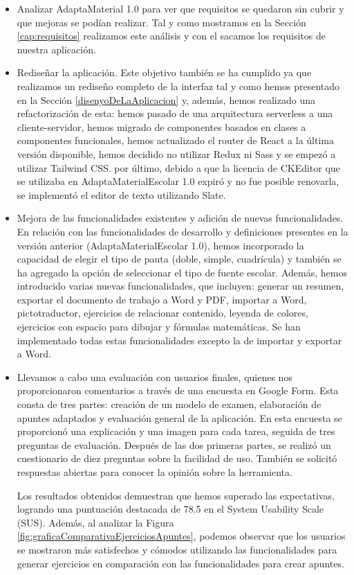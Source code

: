 \begin{itemize}
    \item Analizar AdaptaMaterial 1.0 para ver que requisitos se quedaron sin cubrir y que mejoras se podían realizar. Tal y como mostramos en la Sección \ref{cap:requisitos} realizamos este análisis y con el sacamos los requisitos de nuestra aplicación.
    \item Rediseñar la aplicación. Este objetivo también se ha cumplido ya que realizamos un rediseño completo de la interfaz tal y como hemos presentado en la Sección \ref{disenyoDeLaAplicacion} y, además, hemos realizado una refactorización de esta: hemos pasado de una arquitectura serverless a una cliente-servidor, hemos migrado de componentes basados en clases a componentes funcionales, hemos actualizado el router de React a la última versión disponible, hemos decidido no utilizar Redux ni Sass y se empezó a utilizar Tailwind CSS. por último, debido a que la licencia de CKEditor que se utilizaba en AdaptaMaterialEscolar 1.0 expiró y no fue posible renovarla, se implementó el editor de texto utilizando Slate.
    \item Mejora de las funcionalidades existentes y adición de nuevas funcionalidades. En relación con las funcionalidades de desarrollo y definiciones presentes en la versión anterior (AdaptaMaterialEscolar 1.0), hemos incorporado la capacidad de elegir el tipo de pauta (doble, simple, cuadrícula) y también se ha agregado la opción de seleccionar el tipo de fuente escolar. Además, hemos introducido varias nuevas funcionalidades, que incluyen: generar un resumen, exportar el documento de trabajo a Word y PDF, importar a Word, pictotraductor, ejercicios de relacionar contenido, leyenda de colores, ejercicios con espacio para dibujar y fórmulas matemáticas. Se han implementado todas estas funcionalidades excepto la de importar y exportar a Word.
    \item Llevamos a cabo una evaluación con usuarios finales, quienes nos proporcionaron comentarios a través de una encuesta en Google Form. Esta consta de tres partes: creación de un modelo de examen, elaboración de apuntes adaptados y evaluación general de la aplicación. En esta encuesta se proporcionó una explicación y una imagen para cada tarea, seguida de tres preguntas de evaluación. Después de las dos primeras partes, se realizó un cuestionario de diez preguntas sobre la facilidad de uso. También se solicitó respuestas abiertas para conocer la opinión sobre la herramienta.
    
    Los resultados obtenidos demuestran que hemos superado las expectativas, logrando una puntuación destacada de 78.5 en el System Usability Scale (SUS). Además, al analizar la Figura \ref{fig:graficaComparativaEjerciciosApuntes}, podemos observar que los usuarios se mostraron más satisfechos y cómodos utilizando las funcionalidades para generar ejercicios en comparación con las funcionalidades para crear apuntes.
\end{itemize}

